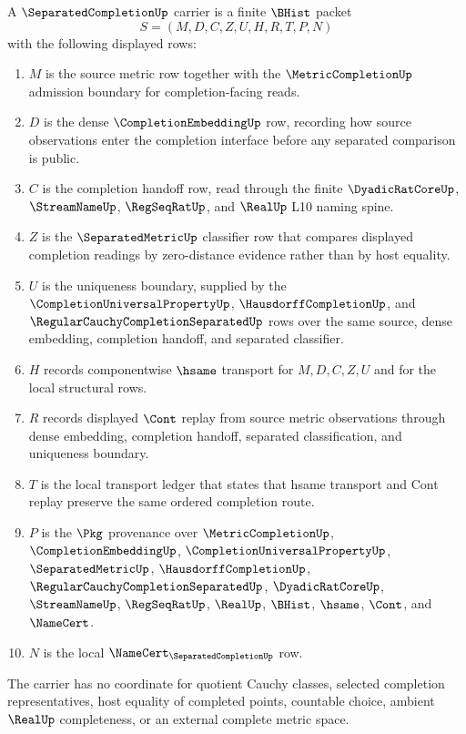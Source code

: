 \begin{definition}
\label{def:separated-completion-carrier}
A $\SeparatedCompletionUp$ carrier is a finite $\BHist$ packet
$$
S=(M,D,C,Z,U,H,R,T,P,N)
$$
with the following displayed rows:
\begin{enumerate}
\item $M$ is the source metric row together with the $\MetricCompletionUp$ admission boundary for completion-facing reads.
\item $D$ is the dense $\CompletionEmbeddingUp$ row, recording how source observations enter the completion interface before any separated comparison is public.
\item $C$ is the completion handoff row, read through the finite $\DyadicRatCoreUp$, $\StreamNameUp$, $\RegSeqRatUp$, and $\RealUp$ L10 naming spine.
\item $Z$ is the $\SeparatedMetricUp$ classifier row that compares displayed completion readings by zero-distance evidence rather than by host equality.
\item $U$ is the uniqueness boundary, supplied by the $\CompletionUniversalPropertyUp$, $\HausdorffCompletionUp$, and $\RegularCauchyCompletionSeparatedUp$ rows over the same source, dense embedding, completion handoff, and separated classifier.
\item $H$ records componentwise $\hsame$ transport for $M,D,C,Z,U$ and for the local structural rows.
\item $R$ records displayed $\Cont$ replay from source metric observations through dense embedding, completion handoff, separated classification, and uniqueness boundary.
\item $T$ is the local transport ledger that states that hsame transport and Cont replay preserve the same ordered completion route.
\item $P$ is the $\Pkg$ provenance over $\MetricCompletionUp$, $\CompletionEmbeddingUp$, $\CompletionUniversalPropertyUp$, $\SeparatedMetricUp$, $\HausdorffCompletionUp$, $\RegularCauchyCompletionSeparatedUp$, $\DyadicRatCoreUp$, $\StreamNameUp$, $\RegSeqRatUp$, $\RealUp$, $\BHist$, $\hsame$, $\Cont$, and $\NameCert$.
\item $N$ is the local $\NameCert_{\SeparatedCompletionUp}$ row.
\end{enumerate}
The carrier has no coordinate for quotient Cauchy classes, selected completion representatives, host equality of completed points, countable choice, ambient $\RealUp$ completeness, or an external complete metric space.
\end{definition}

